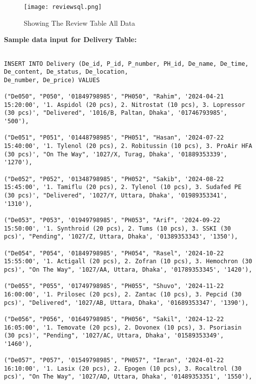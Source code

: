 \documentclass[11pt]{article}
\begin{document}
\begin{figure}[H]
    \centering
    \texttt{[image: reviewsql.png]}
    \caption{Showing The Review Table All Data}
    \label{fig:1}
\end{figure}

\newline
\newline
\newline

 \textbf{{Sample data input for Delivery Table:}}
\begin{lstlisting}

INSERT INTO Delivery (De_id, P_id, P_number, PH_id, De_name, De_time, De_content, De_status, De_location,
De_number, De_price) VALUES

("De050", "P050", '01849798985', "PH050", "Rahim", '2024-04-21 15:20:00', '1. Aspidol (20 pcs), 2. Nitrostat (10 pcs), 3. Lopressor (30 pcs)', "Delivered", '1016/B, Paltan, Dhaka', '01746793985', '500'),

("De051", "P051", '01448798985', "PH051", "Hasan", '2024-07-22 15:40:00', '1. Tylenol (20 pcs), 2. Robitussin (10 pcs), 3. ProAir HFA (30 pcs)', "On The Way", '1027/X, Turag, Dhaka', '01889353339', '1270'),

("De052", "P052", '01348798985', "PH052", "Sakib", '2024-08-22 15:45:00', '1. Tamiflu (20 pcs), 2. Tylenol (10 pcs), 3. Sudafed PE (30 pcs)', "Delivered", '1027/Y, Uttara, Dhaka', '01989353341', '1310'),

("De053", "P053", '01949798985', "PH053", "Arif", '2024-09-22 15:50:00', '1. Synthroid (20 pcs), 2. Tums (10 pcs), 3. SSKI (30 pcs)', "Pending", '1027/Z, Uttara, Dhaka', '01389353343', '1350'),

("De054", "P054", '01849798985', "PH054", "Rasel", '2024-10-22 15:55:00', '1. Actigall (20 pcs), 2. Zofran (10 pcs), 3. Hemochron (30 pcs)', "On The Way", '1027/AA, Uttara, Dhaka', '01789353345', '1420'),

("De055", "P055", '01749798985', "PH055", "Shuvo", '2024-11-22 16:00:00', '1. Prilosec (20 pcs), 2. Zantac (10 pcs), 3. Pepcid (30 pcs)', "Delivered", '1027/AB, Uttara, Dhaka', '01689353347', '1390'),

("De056", "P056", '01649798985', "PH056", "Sakil", '2024-12-22 16:05:00', '1. Temovate (20 pcs), 2. Dovonex (10 pcs), 3. Psoriasin (30 pcs)', "Pending", '1027/AC, Uttara, Dhaka', '01589353349', '1460'),

("De057", "P057", '01549798985', "PH057", "Imran", '2024-01-22 16:10:00', '1. Lasix (20 pcs), 2. Epogen (10 pcs), 3. Rocaltrol (30 pcs)', "On The Way", '1027/AD, Uttara, Dhaka', '01489353351', '1550'),


\end{lstlisting}
\end{document}
